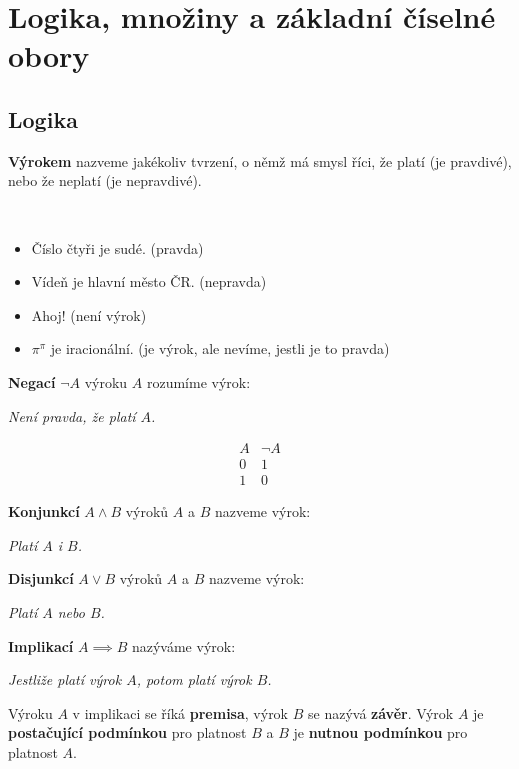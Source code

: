 \section{Logika, množiny a základní číselné obory}
\subsection{Logika}

\textbf{Výrokem} nazveme jakékoliv tvrzení, o němž má smysl říci, že platí (je pravdivé), nebo že neplatí (je nepravdivé).

\begin{priklad}\,
\begin{itemize}
	\item Číslo čtyři je sudé. (pravda)
	\item Vídeň je hlavní město ČR. (nepravda)
	\item Ahoj! (není výrok)
	\item $\pi^\pi$ je iracionální. (je výrok, ale nevíme, jestli je to pravda)
\end{itemize}
\end{priklad}

\begin{definice}
\textbf{Negací} $\neg A$ výroku $A$ rozumíme výrok:
\begin{center}
	\emph{Není pravda, že platí $A$.}
\end{center}
\[
\begin{array}{c|c}
A & \neg A \\
\hline
0 & 1 \\
1 & 0
\end{array}
\]
\end{definice}

\begin{definice}
\textbf{Konjunkcí} $A \wedge B$ výroků $A$ a $B$ nazveme výrok:

\begin{center}
	\emph{Platí $A$ i $B$.}
\end{center}
\end{definice}

\begin{definice}
\textbf{Disjunkcí} $A \vee B$ výroků $A$ a $B$ nazveme výrok:

\begin{center}
	\emph{Platí $A$ nebo $B$.}
\end{center}
\end{definice}

\begin{definice}
\textbf{Implikací} $A \implies B$ nazýváme výrok:

\begin{center}
	\emph{Jestliže platí výrok $A$, potom platí výrok $B$.}
\end{center}

Výroku $A$ v implikaci se říká \textbf{premisa}, výrok $B$ se nazývá \textbf{závěr}.
Výrok $A$ je \textbf{postačující podmínkou} pro platnost $B$ a $B$ je \textbf{nutnou podmínkou} pro platnost $A$.
\end{definice}

